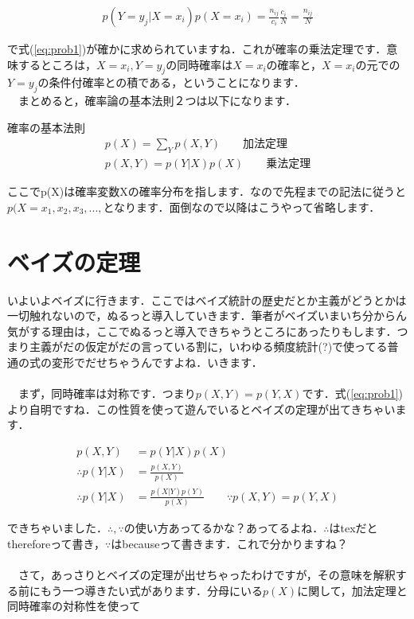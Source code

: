 \documentclass[11pt,a4paper,uplatex]{ujreport} 	%
\begin{document}
\begin{align}
p(Y=y_j | X=x_i)p(X=x_i) = \frac{n_{ij}}{c_i}\frac{c_i}{N} = \frac{n_{ij}}{N}
\label{eq:product}
\end{align}

で式(\ref{eq:prob1})が確かに求められていますね．これが確率の乗法定理です．意味するところは，$X=x_i, Y=y_j$の同時確率は$X=x_i$の確率と，$X=x_i$の元での$Y=y_j$の条件付確率との積である，ということになります．
\\
　まとめると，確率論の基本法則２つは以下になります．

\begin{screen}
確率の基本法則
\begin{align}
p(X) = \sum_Y p(X,Y) \qquad \text{加法定理} \nonumber \\
p(X,Y) = p(Y|X)p(X) \qquad \text{乗法定理} \nonumber
\end{align}
\end{screen}

ここでp(X)は確率変数Xの確率分布を指します．なので先程までの記法に従うと$p(X=x_1, x_2, x_3, ..., $となります．面倒なので以降はこうやって省略します．

\section{ベイズの定理}
いよいよベイズに行きます．ここではベイズ統計の歴史だとか主義がどうとかは一切触れないので，ぬるっと導入していきます．筆者がベイズいまいち分からん気がする理由は，ここでぬるっと導入できちゃうところにあったりもします．つまり主義がだの仮定がだの言っている割に，いわゆる頻度統計(?)で使ってる普通の式の変形でだせちゃうんですよね．いきます．\\
\\
　まず，同時確率は対称です．つまり$p(X,Y) = p(Y,X)$です．式(\ref{eq:prob1})より自明ですね．この性質を使って遊んでいるとベイズの定理が出てきちゃいます．

\begin{align}
\label{eq:bayes}
p(X, Y) &= p(Y|X)p(X)　\\
\therefore p(Y|X) &= \frac{p(X,Y)}{p(X)}  \\
\therefore p(Y|X) &= \frac{p(X|Y)p(Y)}{p(X)} \qquad \because p(X,Y) = p(Y, X)
\end{align}

できちゃいました．$\therefore, \because$の使い方あってるかな？あってるよね．$\therefore$はtexだとthereforeって書き，$\because$はbecauseって書きます．これで分かりますね？\\
\\
　さて，あっさりとベイズの定理が出せちゃったわけですが，その意味を解釈する前にもう一つ導きたい式があります．分母にいる$p(X)$に関して，加法定理と同時確率の対称性を使って
\end{document}
